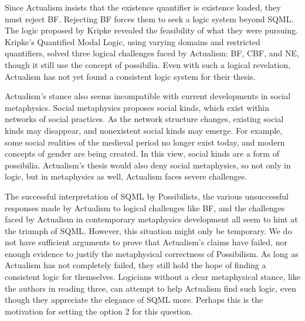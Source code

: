 Since Actualism insists that the existence quantifier is existence loaded, they must reject BF. Rejecting BF forces them to seek a logic system beyond SQML. The logic proposed by Kripke revealed the feasibility of what they were pursuing. Kripke's Quantified Modal Logic, using varying domains and restricted quantifiers, solved three logical challenges faced by Actualism: BF, CBF, and NE, though it still use the concept of possibilia. Even with such a logical revelation, Actualism has not yet found a consistent logic system for their thesis.

Actualism's stance also seems incompatible with current developments in social metaphysics. Social metaphysics proposes social kinds, which exist within networks of social practices. As the network structure changes, existing social kinds may disappear, and nonexistent social kinds may emerge. For example, some social realities of the medieval period no longer exist today, and modern concepts of gender are being created. In this view, social kinds are a form of possibilia. Actualism's thesis would also deny social metaphysics, so not only in logic, but in metaphysics as well, Actualism faces severe challenges.

The successful interpretation of SQML by Possibilists, the various unsuccessful responses made by Actualism to logical challenges like BF, and the challenges faced by Actualism in contemporary metaphysics development all seem to hint at the triumph of SQML. However, this situation might only be temporary. We do not have sufficient arguments to prove that Actualism's claims have failed, nor enough evidence to justify the metaphysical correctness of Possibilism. As long as Actualism has not completely failed, they still hold the hope of finding a consistent logic for themselves. Logicians without a clear metaphysical stance, like the authors in reading three, can attempt to help Actualism find such logic, even though they appreciate the elegance of SQML more. Perhaps this is the motivation for setting the option 2 for this question.
